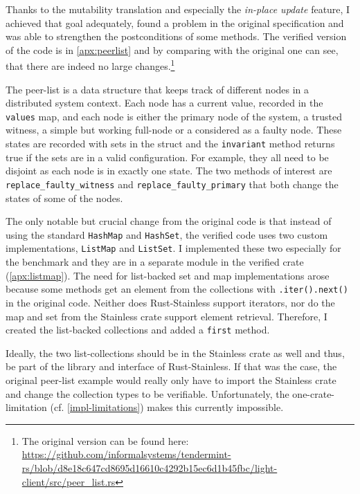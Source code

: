 Thanks to the mutability translation and especially the \emph{in-place update}
feature, I achieved that goal adequately, found a problem in the original
specification and was able to strengthen the postconditions of some methods.
The verified version of the code is in \autoref{apx:peerlist} and by comparing
with  the original one can see, that there are indeed no large
changes.\footnote{The original version can be found here:
\url{https://github.com/informalsystems/tendermint-rs/blob/d8e18c647cd8695d16610c4292b15ec6d1b45fbc/light-client/src/peer_list.rs}}

The peer-list is a data structure that keeps track of different nodes in a
distributed system context. Each node has a current value, recorded in the
\lstinline!values! map, and each node is either the primary node of the system,
a trusted witness, a simple but working full-node or a considered as a faulty
node. These states are recorded with sets in the struct and the
\lstinline!invariant! method returns true if the sets are in a valid
configuration. For example, they all  need to be disjoint as each node is in
exactly one state. The two methods of interest are
\lstinline!replace_faulty_witness! and \lstinline!replace_faulty_primary! that
both  change the states of some of the nodes.

The only notable but crucial change from the original code is that instead of
using the standard \lstinline!HashMap! and  \lstinline!HashSet!, the verified
code uses two custom implementations, \lstinline!ListMap! and
\lstinline!ListSet!. I implemented these two especially for the benchmark and
they are in a separate module in the verified crate (\autoref{apx:listmap}). The
need for list-backed  set and map implementations arose because some methods get
an element from the collections with \lstinline!.iter().next()! in the original
code. Neither does Rust-Stainless support iterators, nor do the map and set from
the Stainless crate support element retrieval. Therefore, I created the
list-backed collections and added a \lstinline!first! method.

Ideally, the two list-collections should be in the Stainless crate as well and
thus, be part of  the library and interface of Rust-Stainless. If that was the
case, the original peer-list example would really only have to import the
Stainless crate and change  the collection types to be verifiable.
Unfortunately,  the one-crate-limitation (cf. \autoref{impl-limitations}) makes
this currently impossible.

